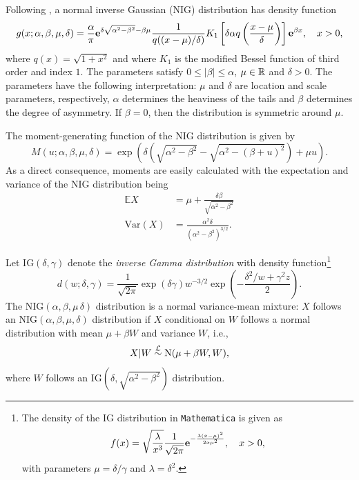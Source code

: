 Following \citep{BarndorffNielsen1997}, a normal inverse Gaussian
(NIG) distribution has density function
\begin{equation*}
  g(x; \alpha,\beta, \mu, \delta) = \frac{\alpha}{\pi} {\bf e}^{\delta
    \sqrt{\alpha^2-\beta^2} -\beta\mu} \frac{1}{q((x-\mu)/\delta)}
  K_1\left[\delta \alpha q\left(\frac{x-\mu}{\delta}\right) \right]
  {\bf e}^{\beta x},\quad x>0,
\end{equation*}
where $q(x) = \sqrt{1+x^2}$ and where $K_1$ is the modified Bessel
function of third order and index $1$. The parameters satisfy $0\leq
|\beta|\leq \alpha$, $\mu\in {\mathbb{R}}$ and $\delta>0$. The parameters have
the following interpretation: $\mu$ and $\delta$ are location and
scale parameters, respectively, $\alpha$ determines the heaviness of
the tails and $\beta$ determines the degree of asymmetry. If
$\beta=0$, then the distribution is symmetric around $\mu$. 

The moment-generating function of the NIG distribution is given by
\begin{equation*}
  M(u; \alpha, \beta, \mu, \delta) = \exp\left( \delta
    \left(\sqrt{\alpha^2-\beta^2} - \sqrt{\alpha^2 - (\beta +
        u)^2}\right) + \mu u\right). 
\end{equation*}
As a direct consequence, moments are easily calculated with the
expectation and variance of the NIG distribution being
\begin{align}
  \label{eq:4}
  \mathbb E X &= \mu + 
                \frac{\delta \beta}{\sqrt{\alpha^2-\beta^2}}\\
  \label{eq:5}
  \text{Var}(X) &= \frac{\alpha^2\delta}{(\alpha^2-\beta^2)^{3/2}}.
\end{align}


Let $\text{IG}(\delta,\gamma)$ denote the {\em inverse Gamma
  distribution} with density function\footnote{%
  The density of the IG distribution in {\tt Mathematica} is given as
  \begin{equation*}
    f(x) = \sqrt{\frac{\lambda}{x^3}} \frac{1}{\sqrt{2\pi}}
    {\bf e}^{-\frac{\lambda(x-\mu)^2}{2 x\mu^2}},\quad x>0,
  \end{equation*}
  with parameters $\mu=\delta/\gamma$ and $\lambda=\delta^2$. 
  }%
\begin{equation}
  \label{eq:2}
  d(w; \delta, \gamma) = \frac{1}{\sqrt{2\pi}} \exp(\delta \gamma)
  w^{-3/2} \exp(-\frac{\delta^2/w + \gamma^2 z}{2}). 
\end{equation}
The $\text{NIG}(\alpha, \beta, \mu\, \delta)$ distribution is a normal
variance-mean mixture: $X$ follows an
$\text{NIG}(\alpha,\beta,\mu,\delta)$ distribution if $X$ conditional
on $W$ follows a normal distribution with mean $\mu+\beta W$ and
variance $W$, i.e., 
\begin{equation*}
  X|W\stackrel{\mathcal L}\sim {\rm N}(\mu + \beta W, W),
\end{equation*}
where $W$ follows an $\text{IG}(\delta, \sqrt{\alpha^2-\beta^2})$
distribution. 

